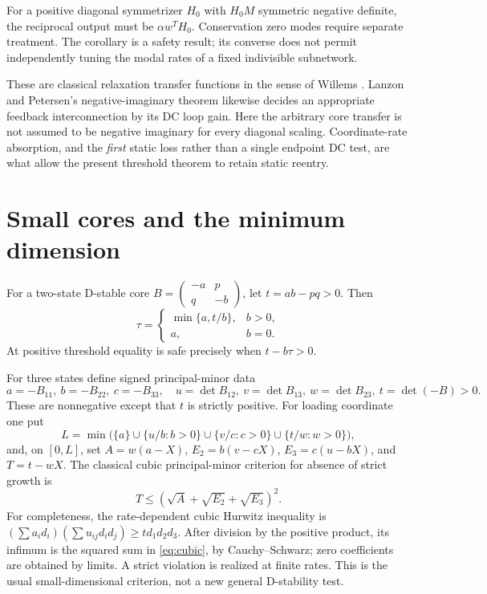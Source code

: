 \documentclass[11pt]{article}
\theoremstyle{remark}\newtheorem{remark}[theorem]{Remark}
\begin{document}
For a positive diagonal symmetrizer $H_0$ with $H_0M$ symmetric negative
definite, the reciprocal output must be $\alpha w^TH_0$. Conservation
zero modes require separate treatment. The corollary is a safety result;
its converse does not permit independently tuning the modal rates of a
fixed indivisible subnetwork.

These are classical relaxation transfer functions in the sense of Willems
\cite{willems,chaffey}. Lanzon and Petersen's negative-imaginary theorem
\cite{lanzon} likewise decides an appropriate feedback interconnection by
its DC loop gain. Here the arbitrary core transfer is not assumed to be
negative imaginary for every diagonal scaling. Coordinate-rate absorption,
and the \emph{first} static loss rather than a single endpoint DC test,
are what allow the present threshold theorem to retain static reentry.

\section{Small cores and the minimum dimension}
For a two-state D-stable core
$B=\left(\begin{smallmatrix}-a&p\\q&-b\end{smallmatrix}\right)$, let
$t=ab-pq>0$. Then
\[
 \tau=\begin{cases}\min\{a,t/b\},&b>0,\\a,&b=0.\end{cases}
\]
At positive threshold equality is safe precisely when $t-b\tau>0$.

For three states define signed principal-minor data
\[
 a=-B_{11},\ b=-B_{22},\ c=-B_{33},\quad
 u=\det B_{12},\ v=\det B_{13},\ w=\det B_{23},\ t=\det(-B)>0.
\]
These are nonnegative except that $t$ is strictly positive. For loading
coordinate one put
\[
 L=\min\bigl(\{a\}\cup\{u/b:b>0\}\cup\{v/c:c>0\}\cup\{t/w:w>0\}\bigr),
\]
and, on $[0,L]$, set
$A=w(a-X)$, $E_2=b(v-cX)$, $E_3=c(u-bX)$, and $T=t-wX$.
The classical cubic principal-minor criterion for absence of strict growth is
\begin{equation}\label{eq:cubic}
 T\le(\sqrt A+\sqrt{E_2}+\sqrt{E_3})^2.
\end{equation}
For completeness, the rate-dependent cubic Hurwitz inequality is
$(\sum a_i d_i)(\sum u_{ij}d_id_j)\ge t d_1d_2d_3$.
After division by the positive product, its infimum is the squared sum
in \eqref{eq:cubic}, by Cauchy--Schwarz; zero coefficients are obtained
by limits. A strict violation is realized at finite rates. This is the
usual small-dimensional criterion, not a new general D-stability test.
\end{document}
